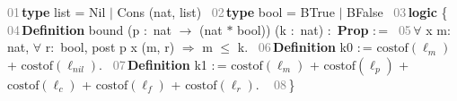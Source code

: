 \bgroup\sf\medskip\begin{flushleft}

\noindent\textrm{\textcolor{Gray}{01\;\;\,}}\hspace{0.5em}\hspace*{0.00000em}\textbf{type} list = Nil \ensuremath{|} Cons (nat, list)~\linebreak
\noindent\textrm{\textcolor{Gray}{02\;\;\,}}\hspace{0.5em}\hspace*{0.00000em}\textbf{type} bool = BTrue \ensuremath{|} BFalse~\linebreak
\noindent\textrm{\textcolor{Gray}{03\;\;\,}}\hspace{0.5em}\hspace*{0.00000em}\textbf{logic} \{ ~\linebreak
\noindent\textrm{\textcolor{Gray}{04\;\;\,}}\hspace{0.5em}\hspace*{0.50000em}\textbf{Definition} bound (p \ensuremath{\colon} nat \ensuremath{\longrightarrow} (nat \ensuremath{\ast} bool)) (k \ensuremath{\colon} nat) \ensuremath{\colon} \textbf{Prop} \ensuremath{\colon}=~\linebreak
\noindent\textrm{\textcolor{Gray}{05\;\;\,}}\hspace{0.5em}\hspace*{2.00000em}\ensuremath{\forall} x m\ensuremath{\colon} nat, \ensuremath{\forall} r\ensuremath{\colon} bool, post p x (m, r) \ensuremath{\Rightarrow} m \ensuremath{\le} k.~\linebreak
\noindent\textrm{\textcolor{Gray}{06\;\;\,}}\hspace{0.5em}\hspace*{0.50000em}\textbf{Definition} k0 \ensuremath{\colon}= \ensuremath{\mbox{costof}(\ell_{m})} + \ensuremath{\mbox{costof}(\ell_{nil})}.~\linebreak
\noindent\textrm{\textcolor{Gray}{07\;\;\,}}\hspace{0.5em}\hspace*{0.50000em}\textbf{Definition} k1 \ensuremath{\colon}= \ensuremath{\mbox{costof}(\ell_{m})} + \ensuremath{\mbox{costof}(\ell_{p})} + \ensuremath{\mbox{costof}(\ell_{c})} + \ensuremath{\mbox{costof}(\ell_{f})} + \ensuremath{\mbox{costof}(\ell_{r})}. ~\linebreak
\noindent\textrm{\textcolor{Gray}{08\;\;\,}}\hspace{0.5em}\hspace*{0.00000em}\}~\linebreak

\end{flushleft}
